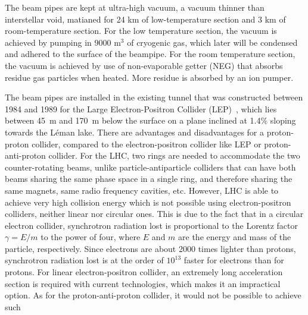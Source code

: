 The beam pipes are kept at ultra-high vacuum, a vacuum thinner than 
interstellar void, matianed for 24 km of low-temperature section and 3 km 
of room-temperature section. For the low temperature section, the vacuum is 
achieved by pumping in $9000$ m$^3$ of cryogenic gas, which later will be 
condensed and adhered to the surface of the beampipe. 
For the room temperature section, the vacuum 
is achieved by use of non-evaporable getter (NEG) that absorbs residue 
gas particles when heated. More residue is absorbed by an ion pumper. 

The beam pipes are installed in the existing tunnel that was constructed 
between 1984 and 1989 for the Large Electron-Positron Collider (LEP)~\cite{Myers:1991ym}, 
which lies between 45~m and 170~m below the surface on a plane inclined at 1.4\% sloping 
towards the Léman lake.
There are advantages and disadvantages for a proton-proton collider,
compared to the electron-positron collider like LEP or proton-anti-proton collider.
For the LHC, two rings are needed to accommodate the two counter-rotating beams, 
unlike particle-antiparticle colliders that can have both beams sharing the same 
phase space in a single ring, and therefore sharing the same magnets, same radio 
frequency cavities, etc. However, LHC is able to achieve very high collision energy
which is not possible using electron-positron colliders, neither linear nor circular ones.
This is due to the fact that in a circular electron collider, synchrotron radiation lost is 
proportional to the Lorentz factor $\gamma = E/m$ to the power of four, where $E$ and $m$ are
the energy and mass of the particle, respectively. Since electrons are about
2000 times lighter than protons, synchrotron radiation lost is at the order of $10^{13}$
faster for electrons than for protons. For linear electron-positron collider, an extremely long
acceleration section is required with current technologies, which makes it an impractical option.
As for the proton-anti-proton collider, it would not be possible to achieve such 
